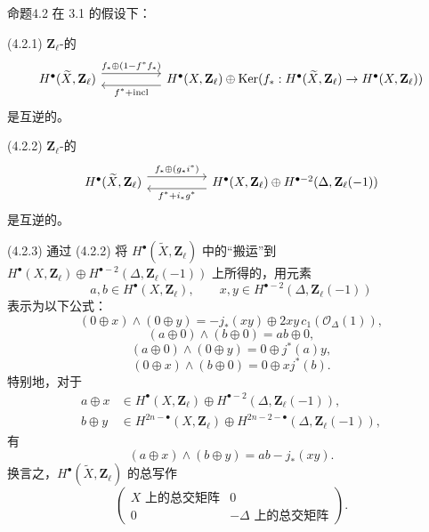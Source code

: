 \begin{SGAresult}{命题}{4.2}
在 3.1 的假设下：

\textup{(4.2.1)} $\mathbf Z_\ell$-的
\[
\begin{tikzcd}[column sep=huge]
H^\bullet(\widetilde X,\mathbf Z_\ell)\arrow[r,shift left=1.1ex,"{f_*\oplus(1-f^*f_*)}"]&H^\bullet(X,\mathbf Z_\ell)\oplus\operatorname{Ker}(f_*:H^\bullet(\widetilde X,\mathbf Z_\ell)\to H^\bullet(X,\mathbf Z_\ell))\arrow[l,shift left=1.1ex,"{f^*+\mathrm{incl}}"]
\end{tikzcd}
\]
是互逆的。

\textup{(4.2.2)} $\mathbf Z_\ell$-的
\[
\begin{tikzcd}[column sep=huge]
H^\bullet(\widetilde X,\mathbf Z_\ell)\arrow[r,shift left=1.1ex,"{f_*\oplus(g_*i^*)}"]&H^\bullet(X,\mathbf Z_\ell)\oplus H^{\bullet-2}(\Delta,\mathbf Z_\ell(-1))\arrow[l,shift left=1.1ex,"{f^*+i_*g^*}"]
\end{tikzcd}
\]
是互逆的。

\textup{(4.2.3)} 通过 (4.2.2) 将 $H^\bullet(\widetilde X,\mathbf Z_\ell)$ 中的“搬运”到 $H^\bullet(X,\mathbf Z_\ell)\oplus H^{\bullet-2}(\Delta,\mathbf Z_\ell(-1))$ 上所得的，用元素
\[
 a,b\in H^\bullet(X,\mathbf Z_\ell),\qquad x,y\in H^{\bullet-2}(\Delta,\mathbf Z_\ell(-1))
\]
表示为以下公式：
\[
 (0\oplus x)\wedge(0\oplus y)=-j_*(xy)\oplus2xy\,c_1(\mathscr O_\Delta(1)),\tag{4.2.3.1}
\]
\[
 (a\oplus0)\wedge(b\oplus0)=ab\oplus0,\tag{4.2.3.2}
\]
\[
 (a\oplus0)\wedge(0\oplus y)=0\oplus j^*(a)y,\tag{4.2.3.3}
\]
\[
 (0\oplus x)\wedge(b\oplus0)=0\oplus xj^*(b).\tag{4.2.3.4}
\]
特别地，对于
\[
\begin{aligned}
a\oplus x&\in H^\bullet(X,\mathbf Z_\ell)\oplus H^{\bullet-2}(\Delta,\mathbf Z_\ell(-1)),\\
b\oplus y&\in H^{2n-\bullet}(X,\mathbf Z_\ell)\oplus H^{2n-2-\bullet}(\Delta,\mathbf Z_\ell(-1)),
\end{aligned}
\]
有
\[
 (a\oplus x)\wedge(b\oplus y)=ab-j_*(xy).\tag{4.2.3.5}
\]
换言之，$H^\bullet(\widetilde X,\mathbf Z_\ell)$ 的总写作
\[
 \begin{pmatrix}
 \text{$X$ 上的总交矩阵}&0\\
 0&-\text{$\Delta$ 上的总交矩阵}
 \end{pmatrix}.
\]
\end{SGAresult}
